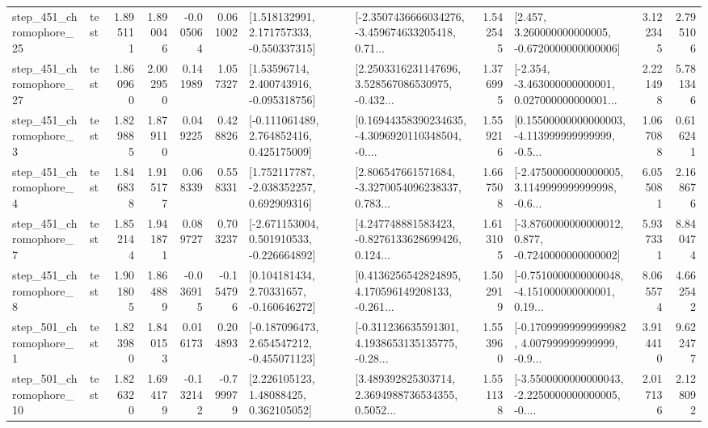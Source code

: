 \begin{tabular}{llrrrrllrlrr}
  step\_451\_chromophore\_25 &      test &      1.895111 &    1.890046 &     -0.005064 &  0.061002 &    [1.518132991, 2.171757333, -0.550337315] &  [-2.3507436666034276, -3.459674633205418, 0.71... &       1.542545 &    [2.457, 3.260000000000005, -0.6720000000000006] &            3.122345 &          2.795106 \\
  step\_451\_chromophore\_27 &      test &      1.860960 &    2.002950 &      0.141989 &  1.057327 &     [1.53596714, 2.400743916, -0.095318756] &  [2.2503316231147696, 3.528567086530975, -0.432... &       1.376995 &  [-2.354, -3.463000000000001, 0.027000000000001... &            2.221498 &          5.781346 \\
   step\_451\_chromophore\_3 &      test &      1.829885 &    1.879110 &      0.049225 &  0.428826 &    [-0.111061489, 2.764852416, 0.425175009] &  [0.16944358390234635, -4.3096920110348504, -0.... &       1.559216 &  [0.15500000000000003, -4.113999999999999, -0.5... &            1.067088 &          0.616241 \\
   step\_451\_chromophore\_4 &      test &      1.846838 &    1.915177 &      0.068339 &  0.558331 &    [1.752117787, -2.038352257, 0.692909316] &  [2.806547661571684, -3.3270054096238337, 0.783... &       1.667508 &  [-2.4750000000000005, 3.1149999999999998, -0.6... &            6.055081 &          2.168676 \\
   step\_451\_chromophore\_7 &      test &      1.852144 &    1.941871 &      0.089727 &  0.703237 &   [-2.671153004, 0.501910533, -0.226664892] &  [4.247748881583423, -0.8276133628699426, 0.124... &       1.613105 &  [-3.8760000000000012, 0.877, -0.7240000000000002] &            5.937331 &          8.840474 \\
   step\_451\_chromophore\_8 &      test &      1.901805 &    1.864889 &     -0.036915 & -0.154796 &     [0.104181434, 2.70331657, -0.160646272] &  [0.4136256542824895, 4.170596149208133, -0.261... &       1.502919 &  [-0.7510000000000048, -4.151000000000001, 0.19... &            8.065574 &          4.662542 \\
   step\_501\_chromophore\_1 &      test &      1.823980 &    1.840153 &      0.016173 &  0.204893 &   [-0.187096473, 2.654547212, -0.455071123] &  [-0.311236635591301, 4.1938653135135775, -0.28... &       1.553960 &  [-0.17099999999999982, 4.007999999999999, -0.9... &            3.914410 &          9.622477 \\
  step\_501\_chromophore\_10 &      test &      1.826320 &    1.694179 &     -0.132142 & -0.799979 &      [2.226105123, 1.48088425, 0.362105052] &  [3.489392825303714, 2.3694988736534355, 0.5052... &       1.551138 &  [-3.5500000000000043, -2.2250000000000005, -0.... &            2.017136 &          2.128092 \\

\end{tabular}
